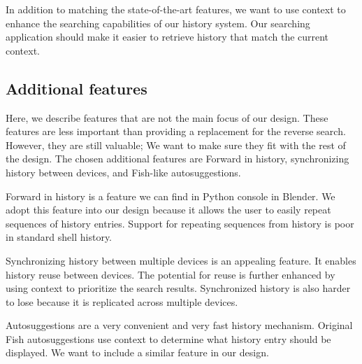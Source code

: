 
In addition to matching the state-of-the-art features, we want to use context to enhance the searching capabilities of our history system. Our searching application should make it easier to retrieve history that match the current context. 


\subsection{Additional features}

Here, we describe features that are not the main focus of our design. These features are less important than providing a replacement for the reverse search. However, they are still valuable; We want to make sure they fit with the rest of the design. 
The chosen additional features are Forward in history, synchronizing history between devices, and Fish-like autosuggestions.




Forward in history is a feature we can find in Python console in Blender. We adopt this feature into our design because it allows the user to easily repeat sequences of history entries. Support for repeating sequences from history is poor in standard shell history.


Synchronizing history between multiple devices is an appealing feature. It enables history reuse between devices. The potential for reuse is further enhanced by using context to prioritize the search results.
Synchronized history is also harder to lose because it is replicated across multiple devices. 


Autosuggestions are a very convenient and very fast history mechanism. Original Fish autosuggestions use context to determine what history entry should be displayed.
We want to include a similar feature in our design.

